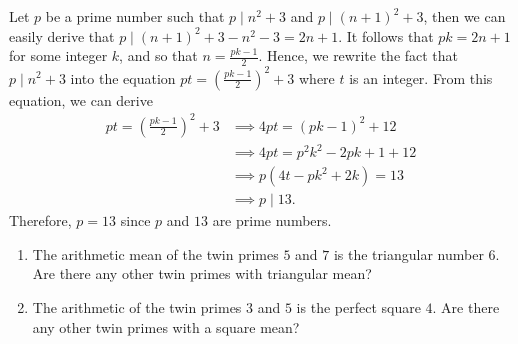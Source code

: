 \begin{solution}
    Let $p$ be a prime number such that $p \mid n^2 + 3$ and $p \mid (n+1)^2 + 3$, then we can easily derive that $p \mid (n+1)^2 + 3 - n^2 - 3 = 2n+1$. It follows that $pk = 2n+1$ for some integer $k$, and so that $n = \frac{pk - 1}{2}$. Hence, we rewrite the fact that $p \mid n^2 + 3$ into the equation $pt = (\frac{pk - 1}{2})^2 + 3$ where $t$ is an integer. From this equation, we can derive
    \begin{align*}
        pt = \left(\frac{pk - 1}{2}\right)^2 + 3 &\implies 4pt = (pk - 1)^2 + 12 \\
        &\implies 4pt = p^2k^2 - 2pk + 1 + 12 \\
        &\implies p(4t - pk^2 + 2k) = 13 \\
        &\implies p \mid 13.
    \end{align*}
    Therefore, $p = 13$ since $p$ and $13$ are prime numbers.\\
\end{solution}

\begin{exercise}
    \begin{enumerate}
        \item The arithmetic mean of the twin primes $5$ and $7$ is the triangular number $6$. Are there any other twin primes with triangular mean?
        \item The arithmetic of the twin primes $3$ and $5$ is the perfect square $4$. Are there any other twin primes with a square mean?
    \end{enumerate}
\end{exercise}

